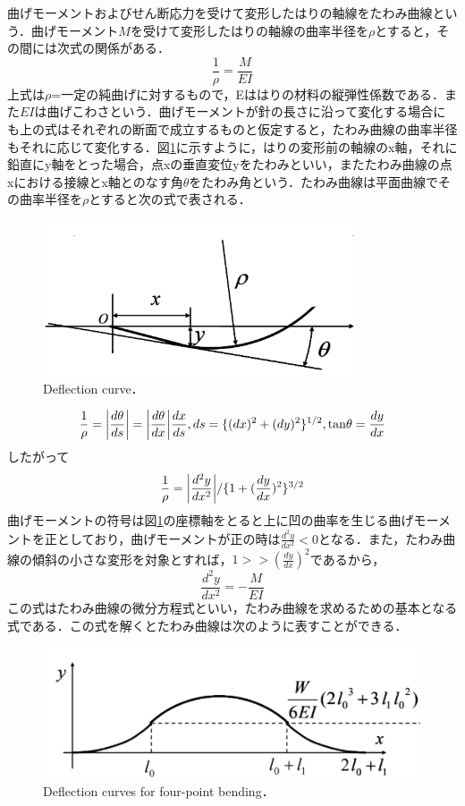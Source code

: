 曲げモーメントおよびせん断応力を受けて変形したはりの軸線をたわみ曲線という．曲げモーメント$M$を受けて変形したはりの軸線の曲率半径を$\rho$とすると，その間には次式の関係がある．
\begin{equation}
    \frac{1}{\rho} = \frac{M}{EI}
\end{equation}
上式は$\rho$=一定の純曲げに対するもので，Eははりの材料の縦弾性係数である．また$EI$は曲げこわさという．曲げモーメントが針の長さに沿って変化する場合にも上の式はそれぞれの断面で成立するものと仮定すると，たわみ曲線の曲率半径もそれに応じて変化する．図\ref{fig:たわみ曲線}に示すように，はりの変形前の軸線のx軸，それに鉛直にy軸をとった場合，点xの垂直変位yをたわみといい，またたわみ曲線の点xにおける接線とx軸とのなす角$\theta$をたわみ角という．たわみ曲線は平面曲線でその曲率半径を$\rho$とすると次の式で表される．
\begin{figure}[htbp]
    \centering %
    \includegraphics[width=100truemm,clip]{fig/fig_たわみ曲線.png}
    \caption{Deflection curve．}

    \label{fig:たわみ曲線}
\end{figure}
\begin{equation}
    \frac{1}{\rho} = \abs{\frac{d\theta}{ds}} = \abs{\frac{d\theta}{dx}} \frac{dx}{ds}, ds = \{(dx)^2 + (dy)^2\}^{1/2}, \mathrm{tan}\theta = \frac{dy}{dx}
\end{equation}
したがって
\begin{equation}
    \frac{1}{\rho} = \abs{\frac{d^2y}{dx^2}} /\{1 + (\frac{dy}{dx})^2\}^{3/2}
\end{equation}
曲げモーメントの符号は図\ref{fig:たわみ曲線}の座標軸をとると上に凹の曲率を生じる曲げモーメントを正としており，曲げモーメントが正の時は$\frac{d^2y}{dx^2} < 0$となる．また，たわみ曲線の傾斜の小さな変形を対象とすれば，$1 >> (\frac{dy}{dx})^2$であるから，
\begin{equation}
    \frac{d^2y}{dx^2} = -\frac{M}{EI}
\end{equation}
この式はたわみ曲線の微分方程式といい，たわみ曲線を求めるための基本となる式である．この式を解くとたわみ曲線は次のように表すことができる．
\begin{figure}[htbp]
    \centering %
    \includegraphics[width=100truemm,clip]{fig/fig_四点曲げたわみ曲線.png}
    \caption{Deflection curves for four-point bending．}
    \label{fig:曲げのたわみ曲線}
\end{figure}
\clearpage


